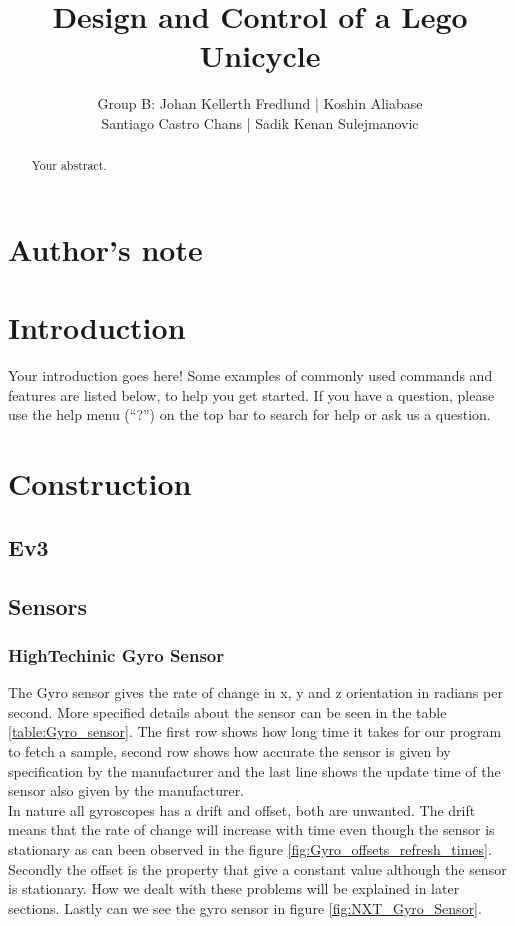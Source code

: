 \documentclass[a4paper]{article}
\title{Design and Control of a Lego Unicycle}
\author{Group B: Johan Kellerth Fredlund | Koshin Aliabase\\ Santiago Castro Chans | Sadik Kenan Sulejmanovic}
\begin{document}
\maketitle

\begin{abstract}
Your abstract.
\end{abstract}

\tableofcontents

\section{Author's note}

\section{Introduction}

Your introduction goes here! Some examples of commonly used commands and features are listed below, to help you get started. If you have a question, please use the help menu (``?'') on the top bar to search for help or ask us a question.

\section{Construction}

	\subsection{Ev3}
    \subsection{Sensors}
    	\subsubsection{HighTechinic Gyro Sensor}
        The Gyro sensor gives the rate of change in x, y and z orientation in radians per second. More specified details about the sensor can be seen in the table \ref{table:Gyro_sensor}. The first row shows how long time it takes for our program to fetch a sample, second row shows how accurate the sensor is given by specification by the manufacturer and the last line shows the update time of the sensor also given by the manufacturer. 
\\In nature all gyroscopes has a drift and offset, both are unwanted. The drift means that the rate of change will increase with time even though the sensor is stationary as can been observed in the figure \ref{fig:Gyro_offsets_refresh_times}. Secondly the offset is the property that give a constant value although the sensor is stationary. How we dealt with these problems will be explained in later sections. Lastly can we see the gyro sensor in figure \ref{fig:NXT_Gyro_Sensor}.  
        
\end{document}
